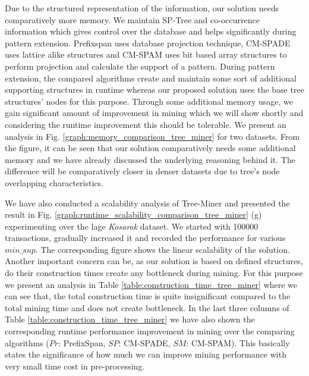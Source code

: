 Due to the structured representation of the information, our solution needs comparatively more memory. We maintain SP-Tree and co-occurrence information which gives control over the database and helps significantly during pattern extension. Prefixspan uses database projection technique, CM-SPADE uses lattice alike structures and CM-SPAM uses bit based array structures to perform projection and calculate the support of a pattern. During pattern extension, the compared algorithms create and maintain some sort of additional supporting structures in runtime whereas our proposed solution uses the base tree structures' nodes for this purpose. Through some additional memory usage, we gain significant amount of improvement in mining which we will show shortly and considering the runtime improvement this should be tolerable. We present an analysis in Fig. \ref{graph:memory_comparison_tree_miner} for two datasets. From the figure, it can be seen that our solution comparatively needs some additional memory and we have already discussed the underlying reasoning behind it. The difference will be comparatively closer in denser datasets due to tree's node overlapping characteristics.  

We have also conducted a scalability analysis of Tree-Miner and presented the result in Fig. \ref{graph:runtime_scalability_comparison_tree_miner} (g) experimenting over the lage \textit{Kosarak} dataset. We started with 100000 transactions, gradually increased it and recorded the performance for various $min\_sup$. The corresponding figure shows the linear scalability of the solution. Another important concern can be, as our solution is based on defined structures, do their construction times create any bottleneck during mining. For this purpose we present an analysis in Table \ref{table:construction_time_tree_miner} where we can see that, the total construction time is quite insignificant compared to the total mining time and does not create bottleneck. In the last three columns of Table \ref{table:construction_time_tree_miner} we have also shown the corresponding runtime performance improvement in mining over the comparing algorithms ($Pr$: PrefixSpan, $SP$: CM-SPADE, $SM$: CM-SPAM). This basically states the significance of how much we can improve mining performance with very small time cost in pre-processing.




